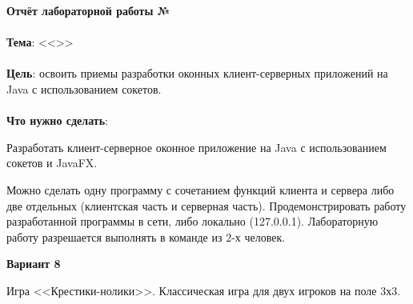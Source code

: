 \documentclass[12pt, a4paper, simple]{eskdtext}
\def \gpiDocTopic {Отчёт лабораторной работы №\gpiDocNum}
\begin{document}
    
    \begin{center}
        \textbf{\gpiDocTopic}
    \end{center}

    \paragraph{} \textbf{Тема}: <<\gpiTopicRep>>

    \paragraph{} \textbf{Цель}: освоить приемы разработки оконных клиент-серверных приложений на Java с использованием сокетов.

    \paragraph{} \textbf{Что нужно сделать}:

    Разработать клиент-серверное оконное приложение на Java с использованием сокетов и JavaFX.

    Можно сделать одну программу с сочетанием функций клиента и сервера либо две отдельных
    (клиентская часть и серверная часть).
    Продемонстрировать работу разработанной программы в сети, либо локально (127.0.0.1).
    Лабораторную работу разрешается выполнять в команде из 2-х человек.

    \begin{center}
        \textbf{Вариант 8}
    \end{center}

    Игра <<Крестики-нолики>>. Классическая игра для двух игроков на поле 3х3.



    
\end{document}
